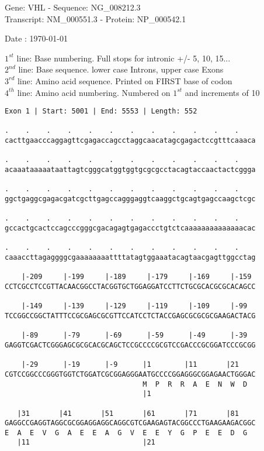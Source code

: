 \documentclass{article}
\begin{document}
\begin{center}
\begin{large}
Gene: VHL - Sequence: NG\_008212.3\\
Transcript: NM\_000551.3 - Protein: NP\_000542.1
 
 Date : \today
\end{large}
\end{center}
$1^{st}$ line: Base numbering. Full stops for intronic +/- 5, 10, 15...\\
$2^{nd}$ line: Base sequence. lower case Introns, upper case Exons\\
$3^{rd}$ line: Amino acid sequence. Printed on FIRST base of codon\\
$4^{th}$ line: Amino acid numbering. Numbered on $1^{st}$ and increments of 10\\
\begin{Verbatim}[fontfamily=courier]
Exon 1 | Start: 5001 | End: 5553 | Length: 552

.    .    .    .    .    .    .    .    .    .    .    .    
cacttgaacccaggagttcgagaccagcctaggcaacatagcgagactccgtttcaaaca

.    .    .    .    .    .    .    .    .    .    .    .    
acaaataaaaataattagtcgggcatggtggtgcgcgcctacagtaccaactactcggga

.    .    .    .    .    .    .    .    .    .    .    .    
ggctgaggcgagacgatcgcttgagccagggaggtcaaggctgcagtgagccaagctcgc

.    .    .    .    .    .    .    .    .    .    .    .    
gccactgcactccagcccgggcgacagagtgagaccctgtctcaaaaaaaaaaaaaacac

.    .    .    .    .    .    .    .    .    .    .    .    
caaaccttagaggggcgaaaaaaaattttatagtggaaatacagtaacgagttggcctag

    |-209     |-199     |-189     |-179     |-169     |-159 
CCTCGCCTCCGTTACAACGGCCTACGGTGCTGGAGGATCCTTCTGCGCACGCGCACAGCC

    |-149     |-139     |-129     |-119     |-109     |-99  
TCCGGCCGGCTATTTCCGCGAGCGCGTTCCATCCTCTACCGAGCGCGCGCGAAGACTACG

    |-89      |-79      |-69      |-59      |-49      |-39  
GAGGTCGACTCGGGAGCGCGCACGCAGCTCCGCCCCGCGTCCGACCCGCGGATCCCGCGG

    |-29      |-19      |-9      |1        |11       |21    
CGTCCGGCCCGGGTGGTCTGGATCGCGGAGGGAATGCCCCGGAGGGCGGAGAACTGGGAC
                                 M  P  R  R  A  E  N  W  D  
                                 |1                         

   |31       |41       |51       |61       |71       |81    
GAGGCCGAGGTAGGCGCGGAGGAGGCAGGCGTCGAAGAGTACGGCCCTGAAGAAGACGGC
E  A  E  V  G  A  E  E  A  G  V  E  E  Y  G  P  E  E  D  G  
   |11                           |21                        

\end{Verbatim}
\end{document}
